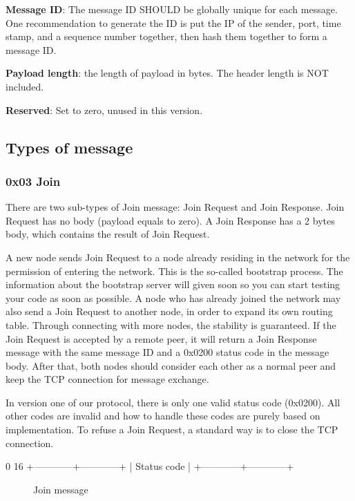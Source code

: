 \documentclass[12pt, a4paper]{article}
\begin{document}
\textbf{Message ID}: The message ID SHOULD be globally unique for each message. 
One recommendation to generate the ID is put the IP of the sender, port, time stamp, and a sequence number together, then hash them together to form a message ID.

\textbf{Payload length}: the length of payload in bytes.
The header length is NOT included.

\textbf{Reserved}: Set to zero, unused in this version.


\subsection{Types of message}

\subsubsection{0x03 Join}
There are two sub-types of Join message: Join Request and Join Response.
Join Request has no body (payload equals to zero).
A Join Response has a 2 bytes body, which contains the result of Join Request.

A new node sends Join Request to a node already residing in the network for the permission of entering the network.
This is the so-called bootstrap process.
The information about the bootstrap server will given soon so you can start testing your code as soon as possible.
A node who has already joined the network may also send a Join Request to another node, in order to expand its own routing table.
Through connecting with more nodes, the stability is guaranteed.
If the Join Request is accepted by a remote peer, it will return a Join Response message with the same message ID and a 0x0200 status code in the message body.
After that, both nodes should consider each other as a normal peer and keep the TCP connection for message exchange.

In version one of our protocol, there is only one valid status code (0x0200).
All other codes are invalid and how to handle these codes are purely based on implementation.
To refuse a Join Request, a standard way is to close the TCP connection.

\begin{verbbox}
0                          16
+------------+------------+
|      Status code        |
+------------+------------+
\end{verbbox}

\begin{figure}[h!]
  \centering
  \theverbbox
  \label{joinrequest}
  \caption{Join message}
\end{figure}
\end{document}
